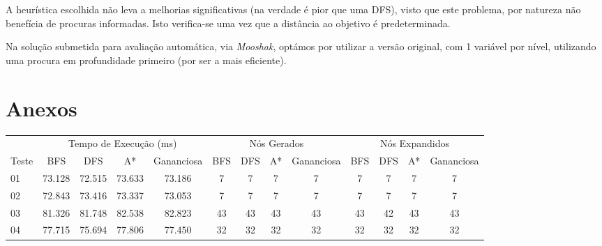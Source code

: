 \documentclass[12pt,a4paper]{article}
\begin{document}
A heurística escolhida não leva a melhorias significativas (na verdade é pior que uma DFS), visto que este problema, por natureza não benefícia de procuras informadas.
Isto verifica-se uma vez que a distância ao objetivo é predeterminada.

 Na solução submetida para avaliação automática, via \textit{Mooshak}, optámos por utilizar a versão original, com 1 variável por nível, utilizando uma procura em profundidade primeiro (por ser a mais eficiente).

\section*{Anexos}


\begin{adjustbox}{width={\textwidth}, totalheight={\textheight}, keepaspectratio}
      \begin{tabular}{l cccc cccc cccc}
            \toprule
                  & \multicolumn{4}{c}{Tempo de Execução (ms)} & \multicolumn{4}{c}{Nós Gerados} & \multicolumn{4}{c}{Nós Expandidos}                                                                            \\
            \cmidrule(lr){2-5} \cmidrule(lr){6-9} \cmidrule(lr){10-13}
            Teste & BFS                                        & DFS                             & A*                                 & Gananciosa & BFS & DFS & A*  & Gananciosa & BFS & DFS & A*  & Gananciosa \\
            \midrule
            01    & 73.128                                     & 72.515                          & 73.633                             & 73.186     & 7   & 7   & 7   & 7          & 7   & 7   & 7   & 7          \\
            02    & 72.843                                     & 73.416                          & 73.337                             & 73.053     & 7   & 7   & 7   & 7          & 7   & 7   & 7   & 7          \\
            03    & 81.326                                     & 81.748                          & 82.538                             & 82.823     & 43  & 43  & 43  & 43         & 43  & 42  & 43  & 43         \\
            04    & 77.715                                     & 75.694                          & 77.806                             & 77.450     & 32  & 32  & 32  & 32         & 32  & 32  & 32  & 32         \\

\end{tabular}
\end{adjustbox}
\end{document}
